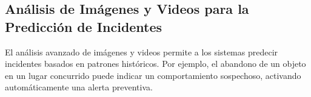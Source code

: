 \subsection{Análisis de Imágenes y Videos para la Predicción de Incidentes}
El análisis avanzado de imágenes y videos permite a los sistemas predecir incidentes basados en patrones históricos. Por ejemplo, el abandono de un objeto en un lugar concurrido puede indicar un comportamiento sospechoso, activando automáticamente una alerta preventiva.